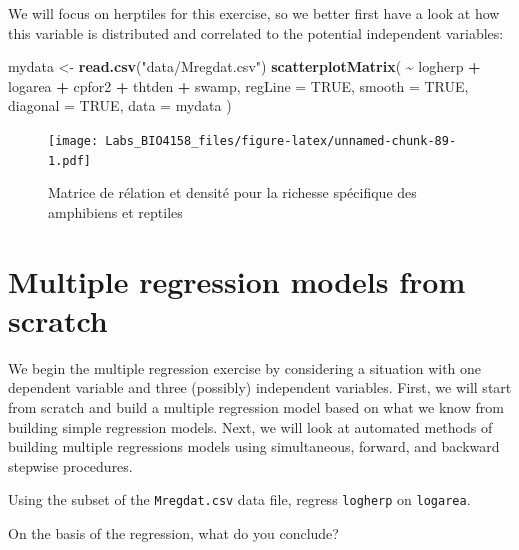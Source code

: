 \documentclass[
  12pt,
]{book}
\makeatletter
\newenvironment{Shaded}{\begin{snugshade}}{\end{snugshade}}
\newcommand{\DataTypeTok}[1]{\textcolor[rgb]{0.13,0.29,0.53}{#1}}
\newcommand{\KeywordTok}[1]{\textcolor[rgb]{0.13,0.29,0.53}{\textbf{#1}}}
\newcommand{\NormalTok}[1]{#1}
\newcommand{\OperatorTok}[1]{\textcolor[rgb]{0.81,0.36,0.00}{\textbf{#1}}}
\newcommand{\OtherTok}[1]{\textcolor[rgb]{0.56,0.35,0.01}{#1}}
\newcommand{\StringTok}[1]{\textcolor[rgb]{0.31,0.60,0.02}{#1}}
\newenvironment{kframe}{%
\medskip{}
\setlength{\fboxsep}{.8em}
\def\at@end@of@kframe{}%
\ifinner\ifhmode%
 \def\at@end@of@kframe{\end{minipage}}%
 \begin{minipage}{\columnwidth}%
\fi\fi%
\def\FrameCommand##1{\hskip\@totalleftmargin \hskip-\fboxsep
\colorbox{incolor}{##1}\hskip-\fboxsep
    \hskip-\linewidth \hskip-\@totalleftmargin \hskip\columnwidth}%
\MakeFramed {\advance\hsize-\width
  \@totalleftmargin\z@ \linewidth\hsize
  \@setminipage}}%
{\par\unskip\endMakeFramed%
\at@end@of@kframe}
\newenvironment{rmdblock}[1]
 {
 \begin{itemize}
 \renewcommand{\labelitemi}{
   \raisebox{-.7\height}[0pt][0pt]{
     {\setkeys{Gin}{width=3em,keepaspectratio}\texttt{[image: images/\#1]}}
   }
 }
 \begin{kframe}
 \setlength{\fboxsep}{1em}
 \item
 }
 {
 \end{kframe}
 \end{itemize}
 }
\newenvironment{rmdcode}
  {\begin{rmdblock}{screen}}
  {\end{rmdblock}}
\makeatother
\begin{document}
We will focus on herptiles for this exercise, so we better first have a look at how this variable is distributed and correlated to the potential independent variables:

\begin{Shaded}
\begin{Highlighting}[]
\NormalTok{mydata \textless{}{-}}\StringTok{ }\KeywordTok{read.csv}\NormalTok{(}\StringTok{"data/Mregdat.csv"}\NormalTok{)}
\KeywordTok{scatterplotMatrix}\NormalTok{(}
  \OperatorTok{\textasciitilde{}}\StringTok{ }\NormalTok{logherp }\OperatorTok{+}\StringTok{ }\NormalTok{logarea }\OperatorTok{+}\StringTok{ }\NormalTok{cpfor2 }\OperatorTok{+}\StringTok{ }\NormalTok{thtden }\OperatorTok{+}\StringTok{ }\NormalTok{swamp,}
  \DataTypeTok{regLine =} \OtherTok{TRUE}\NormalTok{, }\DataTypeTok{smooth =} \OtherTok{TRUE}\NormalTok{, }\DataTypeTok{diagonal =} \OtherTok{TRUE}\NormalTok{,}
  \DataTypeTok{data =}\NormalTok{ mydata}
\NormalTok{)}
\end{Highlighting}
\end{Shaded}

\begin{figure}
\centering
\texttt{[image: Labs\_BIO4158\_files/figure-latex/unnamed-chunk-89-1.pdf]}
\caption{\label{fig:unnamed-chunk-89}Matrice de rélation et densité pour la richesse spécifique des amphibiens et reptiles}
\end{figure}

\hypertarget{multiple-regression-models-from-scratch}{%
\section{Multiple regression models from scratch}\label{multiple-regression-models-from-scratch}}

We begin the multiple regression exercise by considering a situation with one dependent variable and three (possibly) independent variables. First, we will start from scratch and build a multiple regression model based on what we know from building simple regression models. Next, we will look at automated methods of building multiple regressions models using simultaneous, forward, and backward stepwise procedures.

\begin{rmdcode}
Using the subset of the \texttt{Mregdat.csv} data file, regress \texttt{logherp} on \texttt{logarea}.
\end{rmdcode}

On the basis of the regression, what do you conclude?
\end{document}
